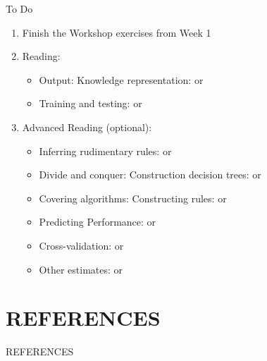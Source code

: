 \documentclass[handout]{beamer}
\begin{document}
\begin{frame}{To Do}
\begin{enumerate}
\item Finish the Workshop exercises from Week 1
\item Reading:
	\begin{itemize}
	\item Output: Knowledge representation: \cite[ch 3]{WFH3:2011} or \cite[ch 4]{WFH4:2016}
	\item Training and testing: \cite[ch 5.1]{WFH3:2011} or \cite[ch 5.1]{WFH4:2016}
	\end{itemize}
\item Advanced Reading (optional):
	\begin{itemize}
	\item Inferring rudimentary rules: \cite[ch 4.1]{WFH3:2011} or \cite[ch 4.1]{WFH4:2016}
	\item Divide and conquer: Construction decision trees: \cite[ch 4.3]{WFH3:2011} or \cite[ch 4.3]{WFH4:2016}
	\item Covering algorithms: Constructing rules: \cite[ch 4.4]{WFH3:2011} or \cite[ch 4.4]{WFH4:2016}
	\item Predicting Performance: \cite[ch 5.2]{WFH3:2011} or \cite[ch 5.2]{WFH4:2016}
	\item Cross-validation: \cite[ch 5.3]{WFH3:2011} or \cite[ch 5.3]{WFH4:2016}
	\item Other estimates: \cite[ch 5.4]{WFH3:2011} or \cite[ch 5.4]{WFH4:2016}
	\end{itemize}
\end{enumerate}
\end{frame}


\section*{REFERENCES}
\begin{frame}[allowframebreaks]{REFERENCES}


\end{frame}
\end{document}
